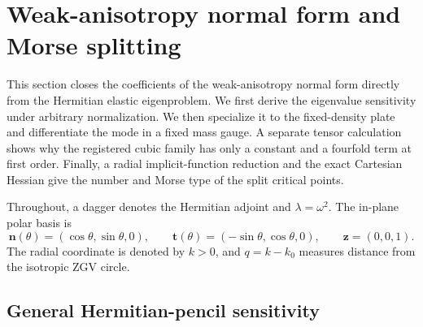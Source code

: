 
\section{Weak-anisotropy normal form and Morse splitting}
\label{sec:anisotropic-morse-derivation}

This section closes the coefficients of the weak-anisotropy normal form
directly from the Hermitian elastic eigenproblem.  We first derive the
eigenvalue sensitivity under arbitrary normalization.  We then specialize
it to the fixed-density plate and differentiate the mode in a fixed mass
gauge.  A separate tensor calculation shows why the registered cubic family
has only a constant and a fourfold term at first order.  Finally, a radial
implicit-function reduction and the exact Cartesian Hessian give the number
and Morse type of the split critical points.

Throughout, a dagger denotes the Hermitian adjoint and
\(\lambda=\omega^2\).  The in-plane polar basis is
\begin{equation}
  \mathbf n(\theta)=(\cos\theta,\sin\theta,0),
  \qquad
  \mathbf t(\theta)=(-\sin\theta,\cos\theta,0),
  \qquad
  \mathbf z=(0,0,1).
  \label{eq:anisotropic-polar-basis}
\end{equation}
The radial coordinate is denoted by \(k>0\), and
\(q=k-k_0\) measures distance from the isotropic ZGV circle.

\subsection{General Hermitian-pencil sensitivity}

